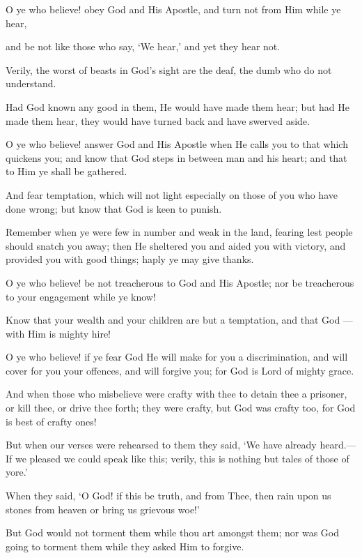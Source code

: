 \documentclass[fontsize=14pt, letterpaper, notitlepage, openany, DIV=12]{scrbook} %
\begin{document}
\noindent[8:20]
O ye who believe! obey God and His Apostle, and turn not from Him while ye hear,

\noindent[8:21]
and be not like those who say, `We hear,' and yet they hear not.

\noindent[8:22]
Verily, the worst of beasts in God's sight are the deaf, the dumb who do not understand.

\noindent[8:23]
Had God known any good in them, He would have made them hear; but had He made
them hear, they would have turned back and have swerved aside.

\noindent[8:24]
O ye who believe! answer God and His Apostle when He calls you to that which
quickens you; and know that God steps in between man and his heart; and that to Him ye shall be
gathered.

\noindent[8:25]
And fear temptation, which will not light especially on those of you who have done
wrong; but know that God is keen to punish.

\noindent[8:26]
Remember when ye were few in number and weak in the land, fearing lest people should
snatch you away; then He sheltered you and aided you with victory, and provided you with good
things; haply ye may give thanks.

\noindent[8:27]
O ye who believe! be not treacherous to God and His Apostle; nor be treacherous to your
engagement while ye know!

\noindent[8:28]
Know that your wealth and your children are but a temptation, and that God --- with Him
is mighty hire!

\noindent[8:29]
O ye who believe! if ye fear God He will make for you a discrimination, and will cover
for you your offences, and will forgive you; for God is Lord of mighty grace.

\noindent[8:30]
And when those who misbelieve were crafty with thee to detain thee a prisoner, or kill
thee, or drive thee forth; they were crafty, but God was crafty too, for God is best of crafty ones!

\noindent[8:31]
But when our verses were rehearsed to them they said, `We have already heard.--- If we
pleased we could speak like this; verily, this is nothing but tales of those of yore.'

\noindent[8:32]
When they said, `O God! if this be truth, and from Thee, then rain upon us stones from
heaven or bring us grievous woe!'

\noindent[8:33]
But God would not torment them while thou art amongst them; nor was God going to
torment them while they asked Him to forgive.
\end{document}
